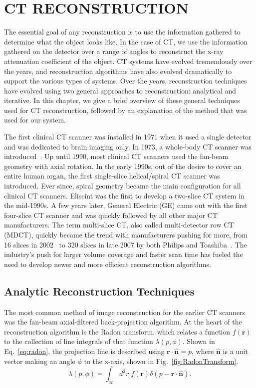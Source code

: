 \chapter{CT RECONSTRUCTION}
\label{chap:reconstruction}

The essential goal of any reconstruction is to use the information gathered to determine what the object looks like.  In the case of CT, we use the information gathered on the detector over a range of angles to reconstruct the x-ray attenuation coefficient of the object.  CT systems have evolved tremendously over the years, and reconstruction algorithms have also evolved dramatically to support the various types of systems. Over the years, reconstruction techniques have evolved using two general approaches to reconstruction: analytical and iterative.  In this chapter, we give a brief overview of these general techniques used for CT reconstruction, followed by an explanation of the method that was used for our system.

The first clinical CT scanner was installed in 1971 when it used a single detector and was dedicated to brain imaging only.  In 1973, a whole-body CT scanner was introduced~\citep{Ulzheimer2009}.  Up until 1990, most clinical CT scanners used the fan-beam geometry with axial rotation.  In the early 1990s, out of the desire to cover an entire human organ, the first single-slice helical/spiral CT scanner was introduced.  Ever since, spiral geometry became the main configuration for all clinical CT scanners.  Eliscint was the first to develop a two-slice CT system in the mid-1990s.  A few years later, General Electric (GE) came out with the first four-slice CT scanner and was quickly followed by all other major CT manufacturers.  The term multi-slice CT, also called multi-detector row CT (MDCT), quickly became the trend with manufacturers pushing for more, from 16 slices in 2002~\citep{Impact2002} to 320 slices in late 2007 by both Philips and Toashiba~\citep{Ulzheimer2009}.  The industry's push for larger volume coverage and faster scan time has fueled the need to develop newer and more efficient reconstruction algorithms.

\section{Analytic Reconstruction Techniques}

The most common method of image reconstruction for the earlier CT scanners was the fan-beam axial-filtered back-projection algorithm.  At the heart of the reconstruction algorithm is the Radon transform, which relates a function $f(\mathbf{r})$ to the collection of line integrals of that function $\lambda(p, \phi)$.  Shown in Eq.~\ref{eq:radon}, the projection line is described using $\mathbf{r \cdot \hat{n}} = p$, where $\mathbf{\hat{n}}$ is a unit vector making an angle $\phi$ to the x-axis, shown in Fig.~\ref{fig:RadonTransform}.  
%
\begin{equation}
\lambda(p, \phi) = \int_\infty d^2r \; f(\mathbf{r}) \delta(p- \mathbf{r} \cdot \mathbf{\hat{n}}).
\label{eq:radon}
\end{equation}

